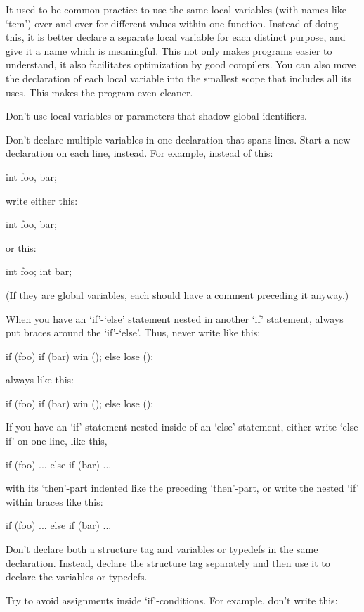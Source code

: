    It used to be common practice to use the same local variables (with
names like `tem') over and over for different values within one
function.  Instead of doing this, it is better declare a separate local
variable for each distinct purpose, and give it a name which is
meaningful.  This not only makes programs easier to understand, it also
facilitates optimization by good compilers.  You can also move the
declaration of each local variable into the smallest scope that includes
all its uses.  This makes the program even cleaner.

   Don't use local variables or parameters that shadow global
identifiers.

   Don't declare multiple variables in one declaration that spans lines.
Start a new declaration on each line, instead.  For example, instead of
this:

     int    foo,
            bar;

write either this:

     int foo, bar;

or this:

     int foo;
     int bar;

(If they are global variables, each should have a comment preceding it
anyway.)

   When you have an `if'-`else' statement nested in another `if'
statement, always put braces around the `if'-`else'.  Thus, never write
like this:

     if (foo)
       if (bar)
         win ();
       else
         lose ();

always like this:

     if (foo)
       {
         if (bar)
           win ();
         else
           lose ();
       }

   If you have an `if' statement nested inside of an `else' statement,
either write `else if' on one line, like this,

     if (foo)
       ...
     else if (bar)
       ...

with its `then'-part indented like the preceding `then'-part, or write
the nested `if' within braces like this:

     if (foo)
       ...
     else
       {
         if (bar)
           ...
       }

   Don't declare both a structure tag and variables or typedefs in the
same declaration.  Instead, declare the structure tag separately and
then use it to declare the variables or typedefs.

   Try to avoid assignments inside `if'-conditions.  For example, don't
write this:

